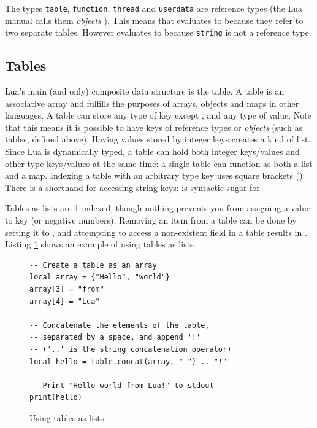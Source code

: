The types \texttt{table}, \texttt{function}, \texttt{thread} and \texttt{userdata} are reference types (the Lua manual calls them \textit{objects} \cite[\S 2.1]{luareferencemanual}). This means that \lua{{} == {}} evaluates to  because they refer to two separate tables. However  evaluates to  because \texttt{string} is not a reference type.

\subsection{Tables}
Lua's main (and only) composite data structure is the table. A table is an associative array and fulfills the purposes of arrays, objects and maps in other languages. A table can store any type of key except , and any type of value. Note that this means it is possible to have keys of reference types or \textit{objects} (such as tables, defined above). Having values stored by integer keys creates a kind of list. Since Lua is dynamically typed, a table can hold both integer keys/values and other type keys/values at the same time: a single table can function as both a list and a map. Indexing a table with an arbitrary type key uses square brackets (). There is a shorthand for accessing string keys:  is syntactic sugar for .

Tables as lists are 1-indexed, though nothing prevents you from assigning a value to key  (or negative numbers). Removing an item from a table can be done by setting it to , and attempting to access a non-existent field in a table results in . Listing \ref{lst:lua_tables} shows an example of using tables as lists.

\begin{figure}[ht]
\centering
\begin{verbatim}
-- Create a table as an array
local array = {"Hello", "world"}
array[3] = "from"
array[4] = "Lua"

-- Concatenate the elements of the table,
-- separated by a space, and append '!'
-- ('..' is the string concatenation operator)
local hello = table.concat(array, " ") .. "!"

-- Print "Hello world from Lua!" to stdout
print(hello)
\end{verbatim}
\caption{Using tables as lists}
\label{lst:lua_tables}
\end{figure}

